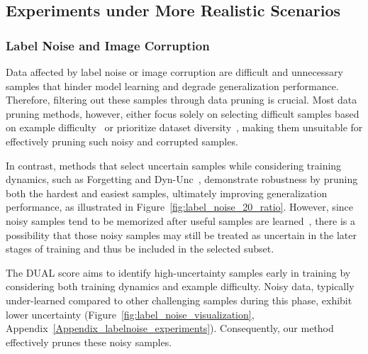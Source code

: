 \subsection{Experiments under More Realistic Scenarios}
\subsubsection{Label Noise and Image Corruption}
Data affected by label noise or image corruption are difficult and unnecessary samples that hinder model learning and degrade generalization performance. Therefore, filtering out these samples through data pruning is crucial. Most data pruning methods, however, either focus solely on selecting difficult samples based on example difficulty~\citep{gordon2021data, pleiss2020identifyingmislabeleddatausing, coleman2020selectionproxyefficientdata} or prioritize dataset diversity~\citep{zheng2022coverage, xia2022moderate}, making them unsuitable for effectively pruning such noisy and corrupted samples.

In contrast, methods that select uncertain samples while considering training dynamics, such as Forgetting \citep{toneva2018empirical} and Dyn-Unc~\citep{he2024large}, demonstrate robustness by pruning both the hardest and easiest samples, ultimately improving generalization performance, as illustrated in Figure~\ref{fig:label_noise_20_ratio}. However, since noisy samples tend to be memorized after useful samples are learned~\citep{arpit2017closer, jiang2020characterizing}, there is a possibility that those noisy samples may still be treated as uncertain in the later stages of training and thus be included in the selected subset.

The DUAL score aims to identify high-uncertainty samples early in training by considering both training dynamics and example difficulty. Noisy data, typically under-learned compared to other challenging samples during this phase, exhibit lower uncertainty (Figure~\ref{fig:label_noise_visualization}, Appendix~\ref{Appendix_labelnoise_experiments}). Consequently, our method effectively prunes these noisy samples.

